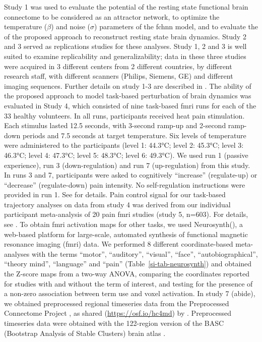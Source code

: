 \documentclass{article}
\begin{document}
Study 1 was used to evaluate the potential of the resting state functional brain connectome to be considered as an attractor network, to optimize the temperature ($\beta$) and noise ($\sigma$) parameters of the \acrshort{fchnn} model, and to evaluate the of the proposed approach to reconstruct resting state brain dynamics. Study 2 and 3 served as replications studies for these analyses. Study 1, 2 and 3 is well suited to examine replicability and generalizability; data in these three studies were acquired in 3 different centers from 2 different countries, by different research staff, with different scanners (Philips, Siemens, GE) and different imaging sequences. Further details on study 1-3 are described in \cite{Spisak_2020}. The ability of the proposed approach to model task-based perturbation of brain dynamics was evaluated in Study 4, which consisted of nine task-based \acrshort{fmri} runs for each of the 33 healthy volunteers. In all runs, participants received heat pain stimulation. Each stimulus lasted 12.5 seconds, with 3-second ramp-up and 2-second ramp-down periods and 7.5 seconds at target temperature. Six levels of temperature were a\acrshort{dm}inistered to the participants (level 1: 44.3°C; level 2: 45.3°C; level 3: 46.3°C; level 4: 47.3°C; level 5: 48.3°C; level 6: 49.3°C). We used run 1 (passive experience),  run 3 (down-regulation) and run 7 (up-regulation) from this study. In runs 3 and 7, participants were asked to cognitively ``increase'' (regulate-up) or ``decrease'' (regulate-down) pain intensity. No self-regulation instructions were provided in run 1. See \citet{woo2015distinct} for details.
Pain control signal for our task-based trajectory analyses on data from study 4 was derived from our individual participant meta-analysis of 20 pain \acrshort{fmri} studies (study 5, n=603). For details, see \citet{zunhammer2021meta}.
To obtain \acrshort{fmri} activation maps for other tasks, we used Neurosynth(\cite{Tor_D__2011}), a web-based platform for large-scale, automated synthesis of functional magnetic resonance imaging (\acrshort{fmri}) data. We performed 8 different coordinate-based meta-analyses with the terms ``motor'', ``auditory'', ``visual'', ``face'', ``autobiographical'', ``theory mind'', ``language'' and ``pain'' (Table~\ref{si-tab-neurosynth}) and obtained the Z-score maps from a two-way ANOVA, comparing the coordinates reported for studies with and without the term of interest, and testing for the presence of a non-zero association between term use and voxel activation.
In study 7 (\acrshort{abide}), we obtained preprocessed regional timeseries data from the Preprocessed Connectome Project \citep{craddock2013towards}, as shared (\href{https://osf.io/hc4md}{https://osf.io/hc4md}) by \citet{dadi2019benchmarking}. Preprocessed timeseries data were obtained with the 122-region version of the BASC (Bootstrap Analysis of Stable Clusters) brain atlas \citep{bellec2010multi}.
\end{document}
